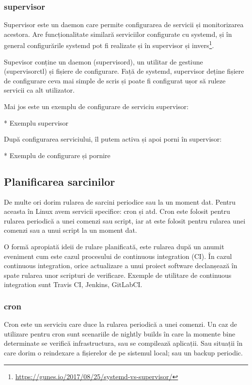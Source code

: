 \subsubsection{supervisor}
\label{sec:script-infosys-services-supervisor}

Supervisor este un daemon care permite configurarea de servicii și monitorizarea
acestora. Are funcționalitate similară serviciilor configurate cu systemd, și în
general configurările systemd pot fi realizate și în supervisor și
invers\footnote{\url{https://gunes.io/2017/08/25/systemd-vs-supervisor/}}.

Supevisor conține un daemon (supervisord), un utilitar de gestiune
(supervisorctl) și fișiere de configurare. Față de systemd, supervisor deține
fișiere de configurare ceva mai simple de scris și poate fi configurat ușor să
ruleze servicii ca alt utilizator.

Mai jos este un exemplu de configurare de serviciu supervisor:

* Exemplu supervisor

După configurarea serviciului, îl putem activa și apoi porni în supervisor:

* Exemplu de configurare și pornire

\subsection{Planificarea sarcinilor}
\label{sec:script-infosys-planning}

De multe ori dorim rularea de sarcini periodice sau la un moment dat. Pentru
aceasta în Linux avem servicii specifice: cron și atd. Cron este folosit pentru
rularea periodică a unei comenzi sau script, iar at este folosit pentru rularea
unei comenzi sau a unui script la un moment dat.

O formă apropiată ideii de rulare planificată, este rularea după un anumit
eveniment cum este cazul procesului de continuous integration (CI). În cazul
continuous integration, orice actualizare a unui proiect software declanșează în
spate rularea unor scripturi de verificare. Exemple de utilitare de continuous
integration sunt Travis CI, Jenkins, GitLabCI.

\subsubsection{cron}
\label{sec:script-infosys-planning-cron}

Cron este un serviciu care duce la rularea periodică a unei comenzi. Un caz de
utilizare pentru cron sunt scenariile de nightly builds în care la momente bine
determinate se verifică infrastructura, sau se compilează aplicații. Sau
situații în care dorim o reindexare a fișierelor de pe sistemul local; sau un
backup periodic.

